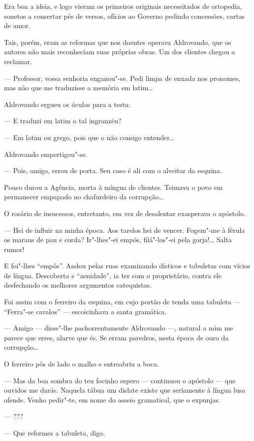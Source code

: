 Era boa a ideia, e logo vieram os primeiros originais necessitados de
ortopedia, sonetos a consertar pés de versos, ofícios ao Governo pedindo
concessões, cartas de amor.

Tais, porém, eram as reformas que nos doentes operava Aldrovando, que os
autores não mais reconheciam suas próprias obras. Um dos clientes chegou
a reclamar.

--- Professor, vossa senhoria enganou"-se. Pedi limpa de enxada nos
pronomes, mas não que me traduzisse a memória em latim\ldots{}

Aldrovando ergueu os óculos para a testa:

--- E traduzi em latim o tal ingranzéu?

--- Em latim ou grego, pois que o não consigo entender\ldots{}

Aldrovando empertigou"-se.

--- Pois, amigo, errou de porta. Seu caso é ali com o alveitar da
esquina.

Pouco durou a Agência, morta à míngua de clientes. Teimava o povo em
permanecer empapado no chafurdeiro da corrupção\ldots{}

O rosário de insucessos, entretanto, em vez de desalentar exasperava o
apóstolo.

--- Hei de influir na minha época. Aos tarelos hei de vencer. Fogem"-me à
férula os maraus de pau e corda? Ir"-lhes"-ei empós, filá"-los"-ei pela
gorja!\ldots{} Salta rumor!

E foi"-lhes ``empós''. Andou pelas ruas examinando dísticos e tabuletas
com vícios de língua. Descoberta e ``asnidade'', ia ter com o
proprietário, contra ele desfechando os melhores argumentos catequistas.

Foi assim com o ferreiro da esquina, em cujo portão de tenda uma
tabuleta --- ``Ferra"-se cavalos'' --- escoicinhava a santa gramática.

--- Amigo --- disse"-lhe pachorrentamente Aldrovando ---, natural a mim
me parece que erres, alarve que és. Se erram paredros, nesta época de
ouro da corrupção\ldots{}

O ferreiro pôs de lado o malho e entreabriu a boca.

--- Mas da boa sombra do teu focinho espero --- continuou o apóstolo ---
que ouvidos me darás. Naquela tábua um dislate existe que seriamente à
língua lusa ofende. Venho pedir"-te, em nome do asseio gramatical, que o
expunjas.

--- ???

--- Que reformes a tabuleta, digo.

